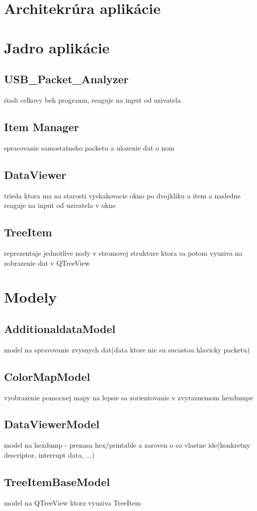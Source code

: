 \newpage
\section{Architekrúra aplikácie}
\section{Jadro aplikácie}
\subsection{USB\_Packet\_Analyzer}
riadi celkovy beh programu, reaguje na input od uzivatela
\subsection{Item Manager}
spracovanie samostatneho packetu a ulozenie dat o nom
\subsection{DataViewer}
trieda ktora ma na starosti vyskakovacie okno po dvojkliku a item a nasledne reaguje na input od uzivatela v okne
\subsection{TreeItem}
reprezentuje jednotlive nody v stromovej strukture ktora sa potom vyuziva na zobrazenie dat v QTreeView
\section{Modely}
\subsection{AdditionaldataModel}
model na spravovanie zvysnych dat(data ktore nie su sucastou hlavicky packetu)
\subsection{ColorMapModel}
vyobrazenie pomocnej mapy na lepsie sa zorientovanie v zvyraznemom hexdumpe
\subsection{DataViewerModel}
model na hexdump - prenasa hex/printable a zaroven o co vlastne ide(konkretny descriptor, interrupt data, ...)
\subsection{TreeItemBaseModel}
model na QTreeView ktorz vyuziva TreeItem
